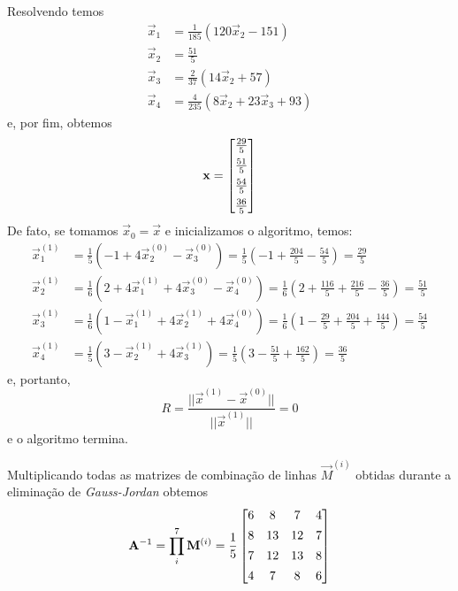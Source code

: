 \documentclass{homework}
\begin{document}
	Resolvendo temos
		\begin{align*}
		\vec{x}_1 &= \frac{1}{185} (120 \vec{x}_2-151)\\
		\vec{x}_2 &= \frac{51}{5}\\
		\vec{x}_3 &= \frac{2}{37} (14 \vec{x}_2+57)\\
		\vec{x}_4 &= \frac{4}{235} (8 \vec{x}_2+23 \vec{x}_3+93)
		\end{align*}
	e, por fim, obtemos
		$$\vec{x} = \left[
		\begin{array}{@{}c@{}}
		\frac{29}{5} \\[1ex]
		\frac{51}{5} \\[1ex]
		\frac{54}{5} \\[1ex]
		\frac{36}{5}
		\end{array}
		\right]$$
	De fato, se tomamos $\vec{x}_0 = \vec{x}$ e inicializamos o algoritmo, temos:
		\begin{align*}
		\vec{x}^{(1)}_1 &= \frac{1}{5} (-1 + 4 \vec{x}^{(0)}_2 - \vec{x}^{(0)}_3) = \frac{1}{5} (-1 + \frac{204}{5} - \frac{54}{5}) = \frac{29}{5}\\
		\vec{x}^{(1)}_2 &= \frac{1}{6} (2 + 4 \vec{x}^{(1)}_1 + 4 \vec{x}^{(0)}_3 - \vec{x}^{(0)}_4) = \frac{1}{6} (2 + \frac{116}{5} + \frac{216}{5} - \frac{36}{5}) = \frac{51}{5}\\
		\vec{x}^{(1)}_3 &= \frac{1}{6} (1 - \vec{x}^{(1)}_1 + 4 \vec{x}^{(1)}_2 + 4 \vec{x}^{(0)}_4) = \frac{1}{6} (1 - \frac{29}{5} + \frac{204}{5} + \frac{144}{5}) = \frac{54}{5}\\
		\vec{x}^{(1)}_4 &= \frac{1}{5} (3 - \vec{x}^{(1)}_2 + 4 \vec{x}^{(1)}_3) = \frac{1}{5} (3 -\frac{51}{5} + \frac{162}{5}) = \frac{36}{5}
		\end{align*}
	e, portanto,
		$$R = \frac{||\vec{x}^{(1)} - \vec{x}^{(0)}||}{||\vec{x}^{(1)}||} = 0$$
	e o algoritmo termina.
		
	
	Multiplicando todas as matrizes de combinação de linhas $\vec{M}^{(i)}$ obtidas durante a eliminação de \textit{Gauss-Jordan} obtemos
		$$\vec{A}^{-1} = \prod_{i}^{7} \vec{M}^{(i)} = \frac{1}{5}\left[\begin{array}{@{}cccc@{}}
		6 & 8 & 7 & 4\\[1ex]
		8 & 13 & 12 & 7\\[1ex]
		7 & 12 & 13 & 8\\[1ex]
		4 & 7 & 8 & 6
		\end{array}\right]$$
	
	
\end{document}
